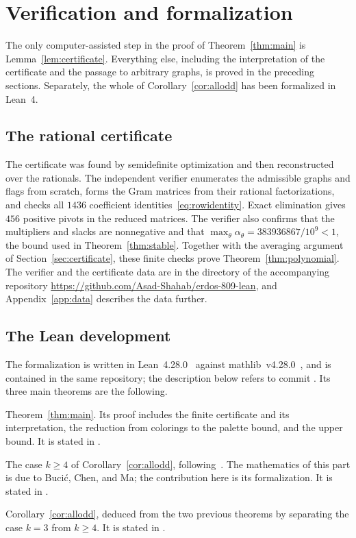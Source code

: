 \section{Verification and formalization}\label{sec:verification}
The only computer-assisted step in the proof of Theorem~\ref{thm:main} is Lemma~\ref{lem:certificate}. Everything else, including the interpretation of the certificate and the passage to arbitrary graphs, is proved in the preceding sections. Separately, the whole of Corollary~\ref{cor:allodd} has been formalized in Lean~4.

\subsection{The rational certificate}
The certificate was found by semidefinite optimization and then reconstructed over the rationals. The independent verifier enumerates the admissible graphs and flags from scratch, forms the Gram matrices from their rational factorizations, and checks all $1436$ coefficient identities~\eqref{eq:rowidentity}. Exact elimination gives $456$ positive pivots in the reduced matrices. The verifier also confirms that the multipliers and slacks are nonnegative and that $\max_\theta\alpha_\theta=383936867/10^9<1$, the bound used in Theorem~\ref{thm:stable}. Together with the averaging argument of Section~\ref{sec:certificate}, these finite checks prove Theorem~\ref{thm:polynomial}. The verifier and the certificate data are in the directory  of the accompanying repository \url{https://github.com/Asad-Shahab/erdos-809-lean}, and Appendix~\ref{app:data} describes the data further.

\subsection{The Lean development}
The formalization is written in Lean~4.28.0~\cite{Lean4} against mathlib~v4.28.0~\cite{Mathlib}, and is contained in the same repository; the description below refers to commit . Its three main theorems are the following.
\begin{description}[leftmargin=1.5em,itemsep=3pt]
\item[\code{Erdos809.erdos_809_C7}] Theorem~\ref{thm:main}. Its proof includes the finite certificate and its interpretation, the reduction from colorings to the palette bound, and the upper bound. It is stated in .
\item[\code{Erdos809.erdos_809_long_odd_cycles}] The case $k\ge4$ of Corollary~\ref{cor:allodd}, following~\cite[Sections~3--4]{BCM2026}. The mathematics of this part is due to Buci\'c, Chen, and Ma; the contribution here is its formalization. It is stated in .
\item[\code{Erdos809.erdos_809}] Corollary~\ref{cor:allodd}, deduced from the two previous theorems by separating the case $k=3$ from $k\ge4$. It is stated in .
\end{description}

